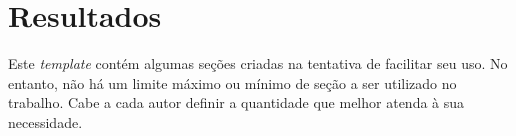 \chapter{Resultados}

Este \textit{template} contém algumas seções criadas na tentativa de facilitar seu uso. No entanto, não há um limite máximo ou mínimo de seção a ser utilizado no trabalho. Cabe a cada autor definir a quantidade que melhor atenda à sua necessidade. 
